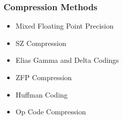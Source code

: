 \documentclass{beamer}
\begin{document}

%	
%	

\begin{frame}
	\frametitle{Compression Methods}
	\begin{itemize}
		\item<1-2> Mixed Floating Point Precision
		\item<1-2> SZ Compression
		\item<1-2> Elias Gamma and Delta Codings
		\item<1> ZFP Compression
		\item<1> Huffman Coding
		\item<1> Op Code Compression
	\end{itemize}
\end{frame}
\end{document}
